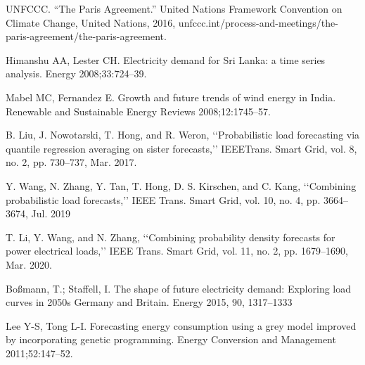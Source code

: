 \documentclass[lettersize,journal]{IEEEtran}
\begin{document}
\begin{thebibliography}{1}
  
  UNFCCC. “The Paris Agreement.” United Nations Framework Convention on Climate Change, United Nations, 2016, unfccc.int/process-and-meetings/the-paris-agreement/the-paris-agreement.
  
  Himanshu AA, Lester CH. Electricity demand for Sri Lanka: a time series analysis. Energy 2008;33:724–39.

  Mabel MC, Fernandez E. Growth and future trends of wind energy in India. Renewable and Sustainable Energy Reviews 2008;12:1745–57.

  B. Liu, J. Nowotarski, T. Hong, and R. Weron, ‘‘Probabilistic load forecasting via quantile regression averaging on sister forecasts,’’ IEEETrans. Smart Grid, vol. 8, no. 2, pp. 730–737, Mar. 2017.

  Y. Wang, N. Zhang, Y. Tan, T. Hong, D. S. Kirschen, and C. Kang, ‘‘Combining probabilistic load forecasts,’’ IEEE Trans. Smart Grid, vol. 10, no. 4, pp. 3664–3674, Jul. 2019

  T. Li, Y. Wang, and N. Zhang, ‘‘Combining probability density forecasts for power electrical loads,’’ IEEE Trans. Smart Grid, vol. 11, no. 2, pp. 1679–1690, Mar. 2020.

  Boßmann, T.; Staffell, I. The shape of future electricity demand: Exploring load curves in 2050s Germany and Britain. Energy 2015, 90, 1317–1333

  Lee Y-S, Tong L-I. Forecasting energy consumption using a grey model improved by incorporating genetic programming. Energy Conversion and Management 2011;52:147–52.

\end{thebibliography}
\end{document}
